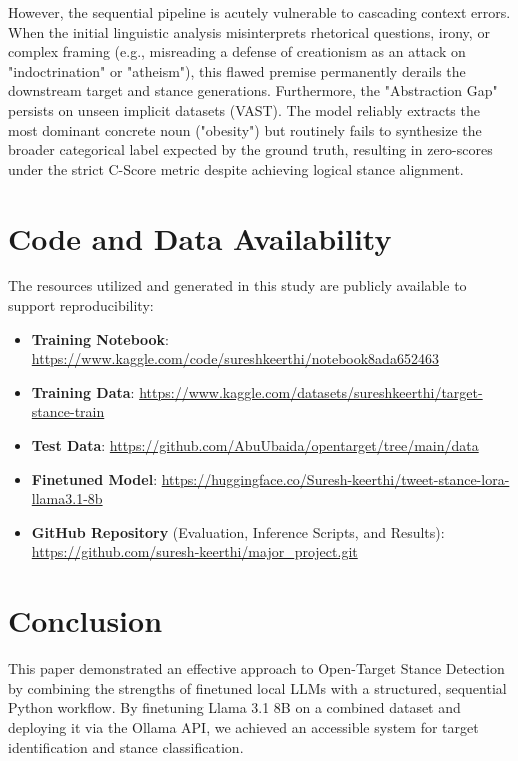 \documentclass[conference]{IEEEtran}
\begin{document}
However, the sequential pipeline is acutely vulnerable to cascading context errors. When the initial linguistic analysis misinterprets rhetorical questions, irony, or complex framing (e.g., misreading a defense of creationism as an attack on "indoctrination" or "atheism"), this flawed premise permanently derails the downstream target and stance generations. Furthermore, the "Abstraction Gap" persists on unseen implicit datasets (VAST). The model reliably extracts the most dominant concrete noun ("obesity") but routinely fails to synthesize the broader categorical label expected by the ground truth, resulting in zero-scores under the strict C-Score metric despite achieving logical stance alignment.


\section{Code and Data Availability}

The resources utilized and generated in this study are publicly available to support reproducibility:

\begin{itemize}
    \item \textbf{Training Notebook}: \url{https://www.kaggle.com/code/sureshkeerthi/notebook8ada652463}
    \item \textbf{Training Data}: \url{https://www.kaggle.com/datasets/sureshkeerthi/target-stance-train}
    \item \textbf{Test Data}: \url{https://github.com/AbuUbaida/opentarget/tree/main/data}
    \item \textbf{Finetuned Model}: \url{https://huggingface.co/Suresh-keerthi/tweet-stance-lora-llama3.1-8b}
    \item \textbf{GitHub Repository} (Evaluation, Inference Scripts, and Results): \url{https://github.com/suresh-keerthi/major_project.git}
\end{itemize}

\section{Conclusion}

This paper demonstrated an effective approach to Open-Target Stance Detection by combining the strengths of finetuned local LLMs with a structured, sequential Python workflow. By finetuning Llama 3.1 8B on a combined dataset and deploying it via the Ollama API, we achieved an accessible system for target identification and stance classification.
\end{document}
